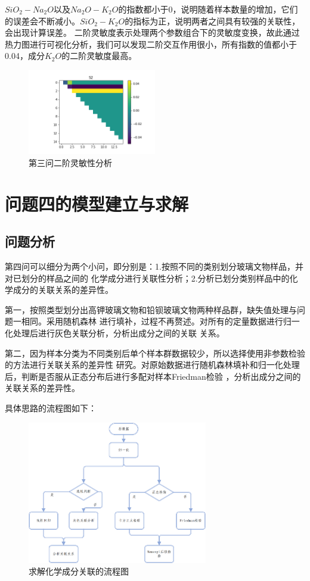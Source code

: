 \documentclass[UTF8]{ctexart}
\begin{document}
$SiO_2-Na_2O$以及$Na_2O-K_2O$的指数都小于0，说明随着样本数量的增加，它们的误差会不断减小。$SiO_2-K_2O$的指标为正，说明两者之间具有较强的关联性，会出现计算误差。
二阶灵敏度表示处理两个参数组合下的灵敏度变换，故此通过热力图进行可视化分析，我们可以发现二阶交互作用很小，所有指数的值都小于0.04，成分$K_2O$的二阶灵敏度最高。

\begin{figure}[H]\centering
    \includegraphics[width=0.5\textwidth,height=0.3\textwidth]{img/S2_heatmap2.png} %
    \caption{第三问二阶灵敏性分析} %
    \label{fig:figure 9} %
\end{figure}


\section{问题四的模型建立与求解}
\subsection{问题分析}
第四问可以细分为两个小问，即分别是：1.按照不同的类别划分玻璃文物样品，并对已划分的样品之间的
化学成分进行关联性分析；2.分析已划分类别样品中的化学成分的关联关系的差异性。

第一，按照类型划分出高钾玻璃文物和铅钡玻璃文物两种样品群，缺失值处理与问题一相同。采用随机森林
进行填补，过程不再赘述。对所有的定量数据进行归一化处理后进行灰色关联分析，分析出成分之间的关联
关系。

第二，因为样本分类为不同类别后单个样本群数据较少，所以选择使用非参数检验的方法进行关联关系的差异性
研究。对原始数据进行随机森林填补和归一化处理后，判断是否服从正态分布后进行多配对样本Friedman检验
，分析出成分之间的关联关系的差异性。

具体思路的流程图如下：
\begin{figure}[H]\centering
    \includegraphics[width=0.7\textwidth,height=0.5\textwidth]{img/求解化学成分关联的流程图.png} %
    \caption{求解化学成分关联的流程图} %
    \label{fig:figure 9} %
\end{figure}
\end{document}
